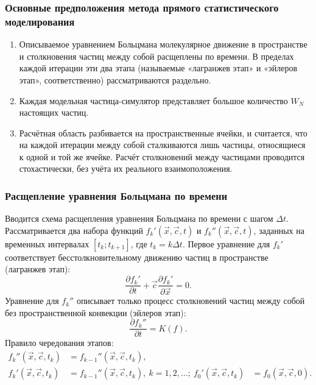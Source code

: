 \documentclass[onlymath]{beamer}
\newcommand{\pardiff}[2]{\frac{\partial{#1}}{\partial{#2}}}
\newcommand{\ts}{\Delta t}
\newcommand{\statw}{W_N}
\begin{document}
\begin{frame}
  \frametitle{Основные предположения метода прямого статистического моделирования}
  \begin{enumerate}
\item Описываемое уравнением Больцмана молекулярное движение в
  пространстве и столкновения частиц между собой расщеплены по
  времени. В пределах каждой итерации эти два этапа (называемые
  «лагранжев этап» и «эйлеров этап», соответственно) рассматриваются
  раздельно.
\item Каждая модельная частица-симулятор представляет большое
  количество $\statw$ настоящих частиц.
\item Расчётная область разбивается на пространственные ячейки, и
  считается, что на каждой итерации между собой сталкиваются лишь
  частицы, относящиеся к одной и той же ячейке. Расчёт столкновений
  между частицами проводится стохастически, без учёта их реального
  взаимоположения.
\end{enumerate}
\end{frame}

\begin{frame}
  \frametitle{Расщепление уравнения Больцмана по времени}
  Вводится схема расщепления уравнения Больцмана по времени с шагом
  $\ts$. Рассматривается два набора функций $f_k'(\vec{x},\vec{c},t)$
  и $f_k''(\vec{x},\vec{c},t)$, заданных на временных интервалах
  $[t_k; t_{k+1}]$, где $t_k = k\ts$. Первое уравнение для $f_k'$
  соответствует бесстолкновительному движению частиц в пространстве
  (лагранжев этап):
  \begin{equation*}
    \label{eq:dsmc-splitting1}
    \pardiff{f_k'}{t} + \vec{c}\pardiff{f_k'}{\vec{x}} = 0.
  \end{equation*}
  Уравнение для $f_k''$ описывает только процесс столкновений частиц
  между собой без пространственной конвекции (эйлеров этап):
  \begin{equation*}
    \label{eq:dsmc-splitting2}
    \pardiff{f_k''}{t} = K(f).
  \end{equation*}
Правило чередования этапов:
\begin{equation*}
  \label{eq:dsmc-splitting3}
  \begin{aligned}
    f_k''(\vec{x},\vec{c},t_k) &=
    f_{k-1}''(\vec{x},\vec{c},t_k),\\
    f_k'(\vec{x},\vec{c},t_k) &=
    f_{k-1}''(\vec{x},\vec{c},t_k),\:k=1,2,\dotsc;\:
    f_0'(\vec{x},\vec{c},t_k) &= f_0(\vec{x}, \vec{c}, 0).
  \end{aligned}
\end{equation*}
\end{frame}
\end{document}
